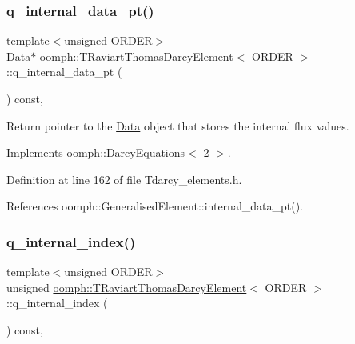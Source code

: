 \subsubsection{\texorpdfstring{q\+\_\+internal\+\_\+data\+\_\+pt()}{q\_internal\_data\_pt()}}
{\footnotesize\ttfamily template$<$unsigned O\+R\+D\+ER$>$ \\
\hyperlink{classoomph_1_1Data}{Data}$\ast$ \hyperlink{classoomph_1_1TRaviartThomasDarcyElement}{oomph\+::\+T\+Raviart\+Thomas\+Darcy\+Element}$<$ O\+R\+D\+ER $>$\+::q\+\_\+internal\+\_\+data\+\_\+pt (\begin{DoxyParamCaption}{ }\end{DoxyParamCaption}) const\hspace{0.3cm}{\ttfamily [inline]}, {\ttfamily [virtual]}}



Return pointer to the \hyperlink{classoomph_1_1Data}{Data} object that stores the internal flux values. 



Implements \hyperlink{classoomph_1_1DarcyEquations_a989dd3449cb776648590119a4b26c061}{oomph\+::\+Darcy\+Equations$<$ 2 $>$}.



Definition at line 162 of file Tdarcy\+\_\+elements.\+h.



References oomph\+::\+Generalised\+Element\+::internal\+\_\+data\+\_\+pt().

\mbox{\label{classoomph_1_1TRaviartThomasDarcyElement_aabea3c06ebef3cc39e7eb25e5833ae84}} 
\subsubsection{\texorpdfstring{q\+\_\+internal\+\_\+index()}{q\_internal\_index()}}
{\footnotesize\ttfamily template$<$unsigned O\+R\+D\+ER$>$ \\
unsigned \hyperlink{classoomph_1_1TRaviartThomasDarcyElement}{oomph\+::\+T\+Raviart\+Thomas\+Darcy\+Element}$<$ O\+R\+D\+ER $>$\+::q\+\_\+internal\+\_\+index (\begin{DoxyParamCaption}{ }\end{DoxyParamCaption}) const\hspace{0.3cm}{\ttfamily [inline]}, {\ttfamily [virtual]}}



